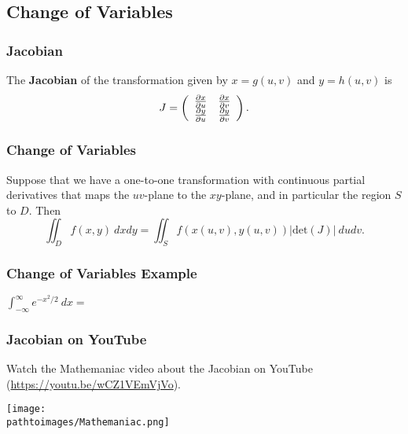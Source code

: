 \documentclass{beamer}
\newcommand{\pathtoimages}{/Users/charlesrambo/Desktop/Bootcamp24/Images}
\begin{document}
\subsection{Change of Variables}

\begin{frame}
\frametitle{Jacobian}
\begin{Definition}
The {\bf Jacobian} of the transformation given by $x = g(u, v)$ and $y = h(u, v)$ is
$$
J = \left(\begin{array}{c c} \frac{\partial x}{\partial u}	&	\frac{\partial x}{\partial v}\\ \frac{\partial y}{\partial u} &	\frac{\partial y}{\partial v}\end{array}\right).
$$
\end{Definition} 

\end{frame}

\begin{frame}
\frametitle{Change of Variables}
Suppose that we have a one-to-one transformation with continuous partial derivatives that maps the $uv$-plane to the $xy$-plane, and in particular the region $S$ to $D$. Then
$$
\iint_D f(x, y)\ dxdy = \iint_S f\left(x(u, v), y(u, v)\right)\left|\text{det}(J)\right|\ dudv.
$$

\end{frame}

\begin{frame}[t]
\frametitle{Change of Variables Example}
\begin{Example}
$\displaystyle\int_{-\infty}^{\infty} e^{-x^2/2}\ dx = $
\end{Example}

\end{frame}

\begin{frame}
\frametitle{Jacobian on YouTube}
\small
Watch the Mathemaniac video about the Jacobian on YouTube (\url{https://youtu.be/wCZ1VEmVjVo}).
\begin{center}
\texttt{[image: \\pathtoimages/Mathemaniac.png]}
\end{center}
\end{frame}
\end{document}
